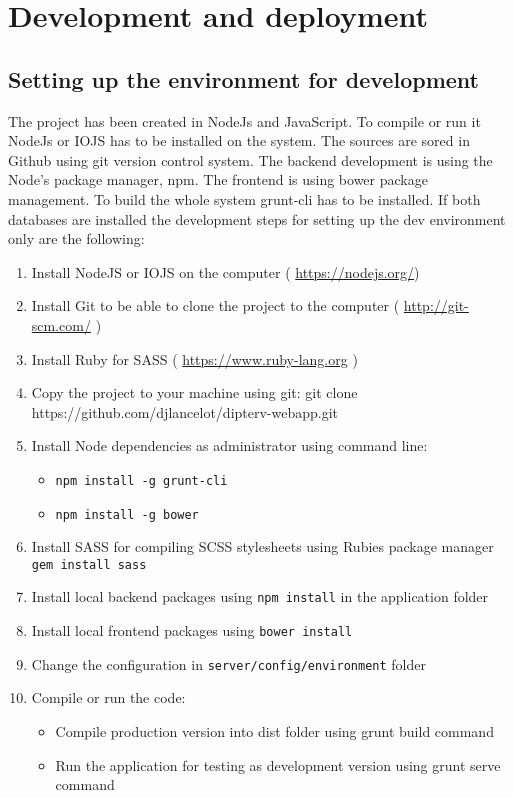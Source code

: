 \appendix
\chapter{Development and deployment}
\section*{Setting up the environment for development}
The project has been created in NodeJs and JavaScript. To compile or run it NodeJs or IOJS has to be installed on the system. The sources are sored in Github using git version control system. The backend development is using the Node's package manager, npm. The frontend is using bower package management. To build the whole system grunt-cli has to be installed. If both databases are installed the development steps for setting up the dev environment only are the following:
\begin{enumerate}
\item Install NodeJS or IOJS on the computer ( \url{https://nodejs.org/})
\item Install Git to be able to clone the project to the computer ( \url{http://git-scm.com/} )
\item Install Ruby for SASS ( \url{https://www.ruby-lang.org} )
\item Copy the project to your machine using git:
git clone https://github.com/djlancelot/dipterv-webapp.git
\item Install Node dependencies as administrator using command line: 
\begin{itemize}
\item \texttt{npm install -g grunt-cli}
\item \texttt{npm install -g bower}
\end{itemize}
\item Install SASS for compiling SCSS stylesheets using Rubies package manager \texttt{gem install sass}
\item Install local backend packages using \texttt{npm install} in the application folder
\item Install local frontend packages using \texttt{bower install}
\item Change the configuration in \texttt{server/config/environment} folder
\item Compile or run the code:
\begin{itemize}
\item Compile production version into dist folder using grunt build command
\item Run the application for testing as development version using grunt serve command
\end{itemize}
\end{enumerate}
